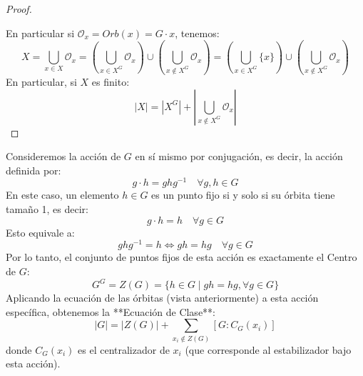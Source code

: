 \begin{proof}
\begin{center}
\end{center}

    En particular si $\mathcal{O}_x = Orb(x) = G \cdot x$, tenemos:
    \begin{equation*}
        X = \bigcup_{x \in X} \mathcal{O}_x = \left(\bigcup_{x \in X^G} \mathcal{O}_x\right) \cup \left(\bigcup_{x \notin X^G} \mathcal{O}_x\right) 
        = \left(\bigcup_{x \in X^G} \{x\}\right) \cup \left(\bigcup_{x \notin X^G} \mathcal{O}_x\right)
    \end{equation*}
    En particular, si $X$ es finito:
    \begin{equation*}
        |X| = |X^G| + \left| \bigcup_{x \notin X^G} \mathcal{O}_x \right|
    \end{equation*}
\end{proof}


\begin{eje}
Consideremos la acción de $G$ en sí mismo por conjugación, es decir, la acción definida por:
\begin{equation*}
    g \cdot h = ghg^{-1} \quad \forall g, h \in G
\end{equation*}
En este caso, un elemento $h \in G$ es un punto fijo si y solo si su órbita tiene tamaño 1, es decir:
\begin{equation*}
    g \cdot h = h \quad \forall g \in G
\end{equation*}
Esto equivale a:
\begin{equation*}
    ghg^{-1} = h \iff gh = hg \quad \forall g \in G
\end{equation*}
Por lo tanto, el conjunto de puntos fijos de esta acción es exactamente el Centro de $G$:
\begin{equation*}
    G^G = Z(G) = \{h \in G \mid gh = hg, \forall g \in G\}
\end{equation*}
Aplicando la ecuación de las órbitas (vista anteriormente) a esta acción específica, obtenemos la **Ecuación de Clase**:
\begin{equation*}
    |G| = |Z(G)| + \sum_{x_i \notin Z(G)} [G : C_G(x_i)]
\end{equation*}
donde $C_G(x_i)$ es el centralizador de $x_i$ (que corresponde al estabilizador bajo esta acción).
\end{eje}



